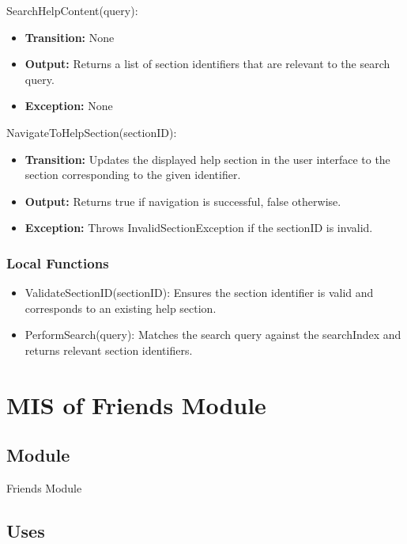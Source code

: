 \documentclass[12pt, titlepage]{article}
\begin{document}
\noindent SearchHelpContent(query):
\begin{itemize}
    \item \textbf{Transition:} None
    \item \textbf{Output:} Returns a list of section identifiers that are relevant to the search query.
    \item \textbf{Exception:} None
\end{itemize}

\noindent NavigateToHelpSection(sectionID):
\begin{itemize}
    \item \textbf{Transition:} Updates the displayed help section in the user interface to the section corresponding to the given identifier.
    \item \textbf{Output:} Returns true if navigation is successful, false otherwise.
    \item \textbf{Exception:} Throws InvalidSectionException if the sectionID is invalid.
\end{itemize}

\subsubsection{Local Functions}

\begin{itemize}
    \item ValidateSectionID(sectionID): Ensures the section identifier is valid and corresponds to an existing help section.
    \item PerformSearch(query): Matches the search query against the searchIndex and returns relevant section identifiers.
\end{itemize}


\newpage

\section{MIS of Friends Module} \label{Module_Friends}

\subsection{Module}

Friends Module

\subsection{Uses}
\end{document}
